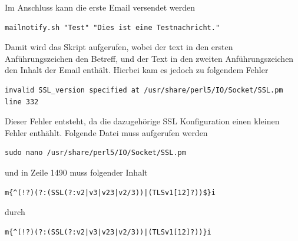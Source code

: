 \documentclass[11pt,a4paper]{article} %
\begin{document}
Im Anschluss kann die erste Email versendet werden
\begin{frame}

\begin{lstlisting}
mailnotify.sh "Test" "Dies ist eine Testnachricht."

\end{lstlisting}
\end{frame}
\newpage
Damit wird das Skript aufgerufen, wobei der text in den ersten Anführungszeichen den Betreff, und der Text in den zweiten Anführungszeichen den Inhalt der Email enthält.
Hierbei kam es jedoch zu folgendem Fehler
\begin{frame}

\begin{lstlisting}
invalid SSL_version specified at /usr/share/perl5/IO/Socket/SSL.pm line 332

\end{lstlisting}
\end{frame}

Dieser Fehler entsteht, da die dazugehörige SSL Konfiguration einen kleinen Fehler enthählt.
Folgende Datei muss aufgerufen werden
\begin{frame}

\begin{lstlisting}
sudo nano /usr/share/perl5/IO/Socket/SSL.pm

\end{lstlisting}
\end{frame}

und in Zeile 1490 muss folgender Inhalt
\begin{frame}

\begin{lstlisting}
m{^(!?)(?:(SSL(?:v2|v3|v23|v2/3))|(TLSv1[12]?))$}i

\end{lstlisting}
\end{frame}

durch
\begin{frame}

\begin{lstlisting}
m{^(!?)(?:(SSL(?:v2|v3|v23|v2/3))|(TLSv1[12]?))}i

\end{lstlisting}
\end{frame}
\end{document}

